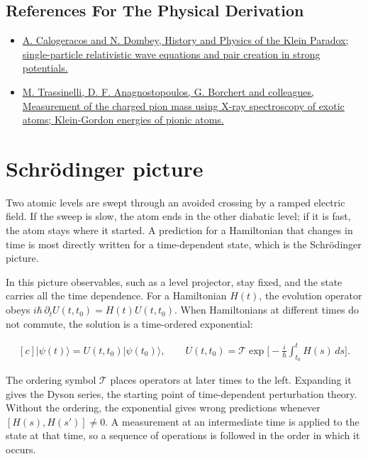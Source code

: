 \documentclass[11pt,oneside]{book}
\newenvironment{centeredalign}{\[\begin{gathered}[c]}{\end{gathered}\]}
\begin{document}
\subsection*{References For The Physical Derivation}
\begin{itemize}
\item \href{https://arxiv.org/abs/quant-ph/9905076}{A. Calogeracos and N. Dombey, History and Physics of the Klein Paradox; single-particle relativistic wave equations and pair creation in strong potentials.}
\item \href{https://arxiv.org/abs/1605.03300}{M. Trassinelli, D. F. Anagnostopoulos, G. Borchert and colleagues, Measurement of the charged pion mass using X-ray spectroscopy of exotic atoms; Klein-Gordon energies of pionic atoms.}
\end{itemize}





\clearpage

\section{Schrödinger picture}

\label{topic:schr-dinger-picture}

Two atomic levels are swept through an avoided crossing by a ramped electric field. If the sweep is slow, the atom ends in the other diabatic level; if it is fast, the atom stays where it started. A prediction for a Hamiltonian that changes in time is most directly written for a time-dependent state, which is the Schrödinger picture.

In this picture observables, such as a level projector, stay fixed, and the state carries all the time dependence. For a Hamiltonian \(H(t)\), the evolution operator obeys \(i\hbar\,\partial_tU(t,t_0)=H(t)U(t,t_0)\). When Hamiltonians at different times do not commute, the solution is a time-ordered exponential:

\begin{centeredalign}
|\psi(t)\rangle=U(t,t_0)|\psi(t_0)\rangle,\qquad
U(t,t_0)=\mathcal T\exp\Big[-\frac{i}{\hbar}\int_{t_0}^{t}H(s)\,ds\Big].
\end{centeredalign}

The ordering symbol \(\mathcal T\) places operators at later times to the left. Expanding it gives the Dyson series, the starting point of time-dependent perturbation theory. Without the ordering, the exponential gives wrong predictions whenever \([H(s),H(s')]\neq0\). A measurement at an intermediate time is applied to the state at that time, so a sequence of operations is followed in the order in which it occurs.
\end{document}
